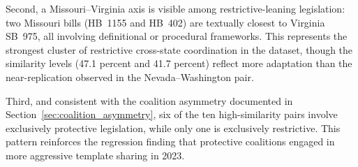 Second, a Missouri--Virginia axis is visible among restrictive-leaning legislation: two Missouri bills (HB~1155 and HB~402) are textually closest to Virginia SB~975, all involving definitional or procedural frameworks. This represents the strongest cluster of restrictive cross-state coordination in the dataset, though the similarity levels (47.1 percent and 41.7 percent) reflect more adaptation than the near-replication observed in the Nevada--Washington pair.

Third, and consistent with the coalition asymmetry documented in Section~\ref{sec:coalition_asymmetry}, six of the ten high-similarity pairs involve exclusively protective legislation, while only one is exclusively restrictive. This pattern reinforces the regression finding that protective coalitions engaged in more aggressive template sharing in 2023.

